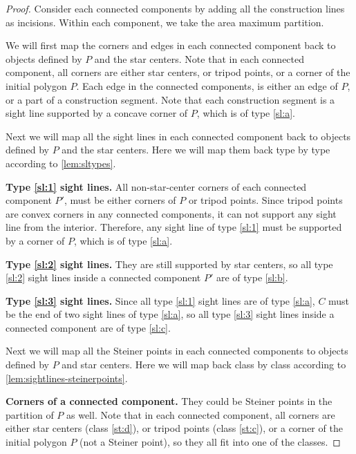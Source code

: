\documentclass{theoretics}
\begin{document}
\begin{proof}
    Consider each connected components by adding all the construction lines as incisions. 
    Within each component, we take the area maximum partition. 

    We will first map the corners and edges in each connected component back to objects defined by $P$ and the star centers. 
    Note that in each connected component, all corners are either star centers, or tripod points, or a corner of the initial polygon $P$. 
    Each edge in the connected components, is either an edge of $P$, or a part of a construction segment. 
    Note that each construction segment is a sight line supported by a concave corner of $P$, which is of type \ref{sl:a}. 

    Next we will map all the sight lines in each connected component back to objects defined by $P$ and the star centers. 
    Here we will map them back type by type according to \cref{lem:sltypes}. 
    
    \textbf{\boldmath Type \ref{sl:1} sight lines. }
    All non-star-center corners of each connected component $P'$, must be either corners of $P$ or tripod points. 
    Since tripod points are convex corners in any connected components, it can not support any sight line from the interior. 
    Therefore, any sight line of type \ref{sl:1} must be supported by a corner of $P$, which is of type \ref{sl:a}. 

    \textbf{\boldmath Type \ref{sl:2} sight lines. }
    They are still supported by star centers, so all type \ref{sl:2} sight lines inside a connected component $P'$ are of type \ref{sl:b}. 

    \textbf{\boldmath Type \ref{sl:3} sight lines. }
    Since all type \ref{sl:1} sight lines are of type \ref{sl:a}, $C$ must be the end of two sight lines of type \ref{sl:a}, so all type \ref{sl:3} sight lines inside a connected component are of type \ref{sl:c}. 

    Next we will map all the Steiner points in each connected components to objects defined by $P$ and star centers. 
    Here we will map back class by class according to \cref{lem:sightlines-steinerpoints}. 

    \textbf{\boldmath Corners of a connected component. }
    They could be Steiner points in the partition of $P$ as well. 
    Note that in each connected component, all corners are either star centers (class \ref{st:d}), or tripod points (class \ref{st:c}), or a corner of the initial polygon $P$ (not a Steiner point), so they all fit into one of the classes. 
    

\end{proof}
\end{document}
